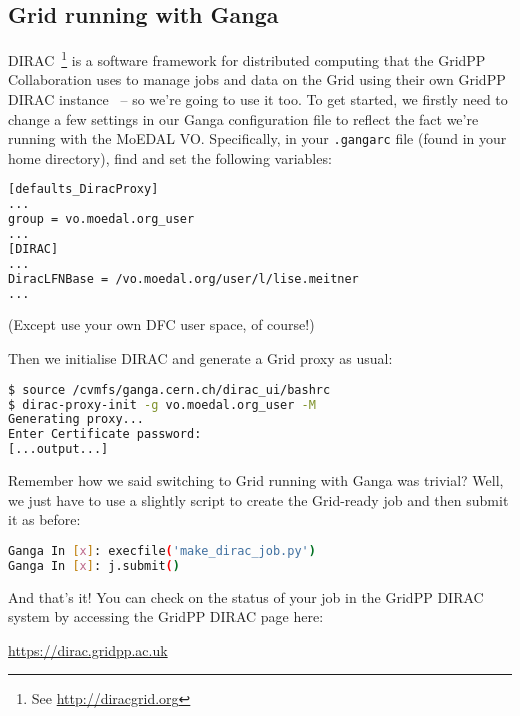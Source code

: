 \subsection{Grid running with Ganga}
\label{sec:moedalgridrunning}
\acs{DIRAC}~\cite{DIRAC2010}\footnote{%
See \href{http://diracgrid.org/}{http://diracgrid.org}} is a software
framework for distributed
computing that the GridPP Collaboration uses to manage
jobs and data on the Grid using their own
GridPP \ac{DIRAC} instance~\cite{GRIDPPDIRAC2015a,GRIDPPDIRAC2015b} --
so we're going to use it too.
To get started, we firstly need to change a few settings in our
Ganga configuration file to reflect the fact we're running
with the \ac{MoEDAL} \ac{VO}. Specifically, in your
\texttt{.gangarc} file (found in your home directory),
find and set the following variables:
 
\begin{lstlisting}[gobble=0,numbers=none,language=bash]
[defaults_DiracProxy]
...
group = vo.moedal.org_user
...
[DIRAC]
...
DiracLFNBase = /vo.moedal.org/user/l/lise.meitner
...
\end{lstlisting}

(Except use your own \ac{DFC} user space, of course!)

Then we initialise \ac{DIRAC} and generate a Grid proxy as usual:

\begin{lstlisting}[gobble=0,numbers=none,language=bash]
$ source /cvmfs/ganga.cern.ch/dirac_ui/bashrc
$ dirac-proxy-init -g vo.moedal.org_user -M
Generating proxy... 
Enter Certificate password:
[...output...]
\end{lstlisting}

Remember how we said switching to Grid running with Ganga was trivial?
Well, we just have to use a slightly script to create the Grid-ready job
and then submit it as before:

\begin{lstlisting}[gobble=0,numbers=none,language=bash]
Ganga In [x]: execfile('make_dirac_job.py') 
Ganga In [x]: j.submit()
\end{lstlisting}

And that's it!
You can check on the status of your job in the GridPP DIRAC
system by accessing the GridPP DIRAC page here:

\href{https://dirac.gridpp.ac.uk}{https://dirac.gridpp.ac.uk}

